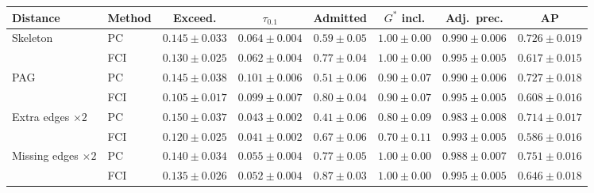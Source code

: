\begin{tabular}{llcccccc}
\toprule
Distance & Method & Exceed. & $\tau_{0.1}$ & Admitted & $G^\ast$ incl. & Adj.\ prec. & AP \\
\midrule
Skeleton & PC & $0.145\pm0.033$ & $0.064\pm0.004$ & $0.59\pm0.05$ & $1.00\pm0.00$ & $0.990\pm0.006$ & $0.726\pm0.019$ \\
 & FCI & $0.130\pm0.025$ & $0.062\pm0.004$ & $0.77\pm0.04$ & $1.00\pm0.00$ & $0.995\pm0.005$ & $0.617\pm0.015$ \\
PAG & PC & $0.145\pm0.038$ & $0.101\pm0.006$ & $0.51\pm0.06$ & $0.90\pm0.07$ & $0.990\pm0.006$ & $0.727\pm0.018$ \\
 & FCI & $0.105\pm0.017$ & $0.099\pm0.007$ & $0.80\pm0.04$ & $0.90\pm0.07$ & $0.995\pm0.005$ & $0.608\pm0.016$ \\
Extra edges $\times2$ & PC & $0.150\pm0.037$ & $0.043\pm0.002$ & $0.41\pm0.06$ & $0.80\pm0.09$ & $0.983\pm0.008$ & $0.714\pm0.017$ \\
 & FCI & $0.120\pm0.025$ & $0.041\pm0.002$ & $0.67\pm0.06$ & $0.70\pm0.11$ & $0.993\pm0.005$ & $0.586\pm0.016$ \\
Missing edges $\times2$ & PC & $0.140\pm0.034$ & $0.055\pm0.004$ & $0.77\pm0.05$ & $1.00\pm0.00$ & $0.988\pm0.007$ & $0.751\pm0.016$ \\
 & FCI & $0.135\pm0.026$ & $0.052\pm0.004$ & $0.87\pm0.03$ & $1.00\pm0.00$ & $0.995\pm0.005$ & $0.646\pm0.018$ \\
\bottomrule
\end{tabular}
